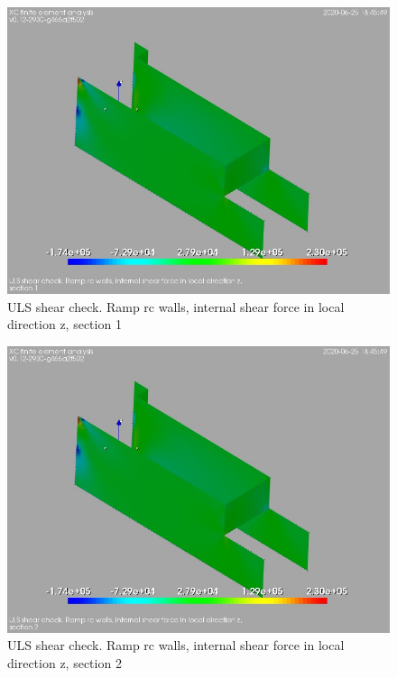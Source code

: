 \begin{figure}
\begin{center}
\includegraphics[width=\linewidth]{ramp_wall/resLC/text/graphics/shearULS/wallsVzSect1}
\caption{ULS shear check. Ramp rc walls, internal shear force in local direction z, section 1}
\end{center}
\end{figure}
\begin{figure}
\begin{center}
\includegraphics[width=\linewidth]{ramp_wall/resLC/text/graphics/shearULS/wallsVzSect2}
\caption{ULS shear check. Ramp rc walls, internal shear force in local direction z, section 2}
\end{center}
\end{figure}
